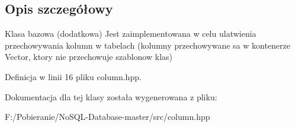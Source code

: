 \subsection{Opis szczegółowy}
Klasa bazowa (dodatkowa) Jest zaimplementowana w celu ulatwienia przechowywania kolumn w tabelach (kolumny przechowywane sa w kontenerze Vector, ktory nie przechowuje szablonow klas) 

Definicja w linii 16 pliku column.\+hpp.



Dokumentacja dla tej klasy została wygenerowana z pliku\+:\begin{DoxyCompactItemize}
\item 
F\+:/\+Pobieranie/\+No\+S\+Q\+L-\/\+Database-\/master/src/column.\+hpp\end{DoxyCompactItemize}
